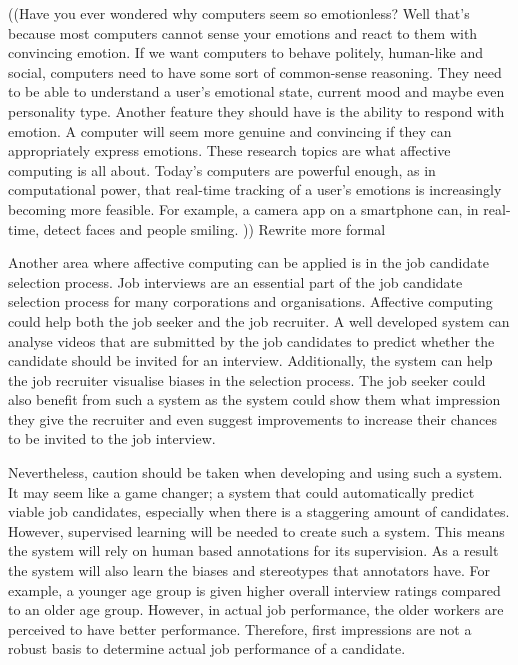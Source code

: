 ((Have you ever wondered why computers seem so emotionless? Well that's because most computers cannot sense your emotions and react to them with convincing emotion. If we want computers to behave politely, human-like and social, computers need to have some sort of common-sense reasoning. They need to be able to understand a user's emotional state, current mood and maybe even personality type. Another feature they should have is the ability to respond with emotion. A computer will seem more genuine and convincing if they can appropriately express emotions. These research topics are what affective computing is all about. Today's computers are powerful enough, as in computational power, that real-time tracking of a user's emotions is increasingly becoming more feasible. For example, a camera app on a smartphone can, in real-time, detect faces and people smiling. )) Rewrite more formal

Another area where affective computing can be applied is in the job candidate selection process. Job interviews are an essential part of the job candidate selection process for many corporations and organisations. Affective computing could help both the job seeker and the job recruiter. A well developed system can analyse videos that are submitted by the job candidates to predict whether the candidate should be invited for an interview. Additionally, the system can help the job recruiter visualise biases in the selection process. The job seeker could also benefit from such a system as the system could show them what impression they give the recruiter and even suggest improvements to increase their chances to be invited to the job interview. 

Nevertheless, caution should be taken when developing and using such a system. It may seem like a game changer; a system that could automatically predict viable job candidates, especially when there is a staggering amount of candidates. However, supervised learning will be needed to create such a system. This means the system will rely on human based annotations for its supervision. As a result the system will also learn the biases and stereotypes that annotators have. For example, a younger age group is given higher overall interview ratings compared to an older age group. However, in actual job performance, the older workers are perceived to have better performance. Therefore, first impressions are not a robust basis to determine actual job performance of a candidate.